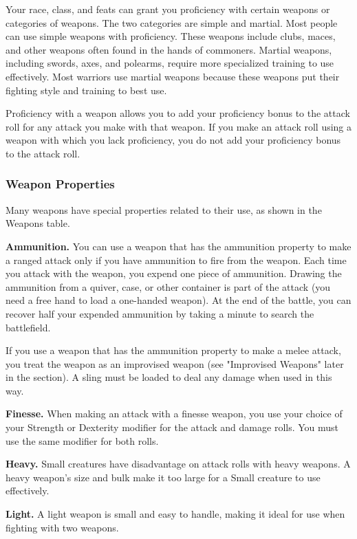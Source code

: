 \documentclass[
]{article}
\begin{document}
Your race, class, and feats can grant you proficiency with certain
weapons or categories of weapons. The two categories are simple and
martial. Most people can use simple weapons with proficiency. These
weapons include clubs, maces, and other weapons often found in the hands
of commoners. Martial weapons, including swords, axes, and polearms,
require more specialized training to use effectively. Most warriors use
martial weapons because these weapons put their fighting style and
training to best use.

Proficiency with a weapon allows you to add your proficiency bonus to
the attack roll for any attack you make with that weapon. If you make an
attack roll using a weapon with which you lack proficiency, you do not
add your proficiency bonus to the attack roll.

\hypertarget{weapon-properties}{%
\subsubsection{Weapon Properties}\label{weapon-properties}}

Many weapons have special properties related to their use, as shown in
the Weapons table.

\textbf{Ammunition.} You can use a weapon that has the ammunition
property to make a ranged attack only if you have ammunition to fire
from the weapon. Each time you attack with the weapon, you expend one
piece of ammunition. Drawing the ammunition from a quiver, case, or
other container is part of the attack (you need a free hand to load a
one-handed weapon). At the end of the battle, you can recover half your
expended ammunition by taking a minute to search the battlefield.

If you use a weapon that has the ammunition property to make a melee
attack, you treat the weapon as an improvised weapon (see "Improvised
Weapons" later in the section). A sling must be loaded to deal any
damage when used in this way.

\textbf{Finesse.} When making an attack with a finesse weapon, you use
your choice of your Strength or Dexterity modifier for the attack and
damage rolls. You must use the same modifier for both rolls.

\textbf{Heavy.} Small creatures have disadvantage on attack rolls with
heavy weapons. A heavy weapon's size and bulk make it too large for a
Small creature to use effectively.

\textbf{Light.} A light weapon is small and easy to handle, making it
ideal for use when fighting with two weapons.
\end{document}
